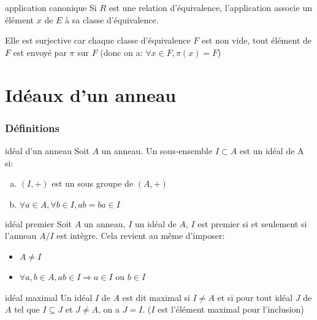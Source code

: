 \begin{proposition}{application canonique}{}
    Si $R$ est une relation d'équivalence, l'application 
    associe un élément $x$ de $E$ à sa classe d'équivalence.

    Elle est surjective car chaque classe d'équivalence $F$ est non vide, tout élément de $F$ est envoyé par
    $\pi$ sur $F$ (donc on a: $\forall x \in F, \pi(x) = F$)
\end{proposition}





\newpage


\section{Idéaux d'un anneau}

\subsubsection{Définitions}

\begin{definition}{idéal d'un anneau}{}
    Soit $A$ un anneau. Un sous-ensemble $I \subset A$ est un idéal de A si:
    \begin{enumerate}[(a)]
        \item $(I, +)$ est un sous groupe de $(A, +)$
        \item $\forall a \in A, \forall b \in I, ab = ba \in I$
    \end{enumerate}
\end{definition}

\begin{definition}{idéal premier}{}
    Soit $A$ un anneau, $I$ un idéal de $A$, $I$ est premier si et seulement si l'anneau $A/I$ est intègre.
    Cela revient au même d'imposer:
    \begin{itemize}
        \item $A \neq I$
        \item $\forall a, b \in A, ab \in I \Longrightarrow a \in I$ ou $ b \in I$
    \end{itemize}
\end{definition}

\begin{definition}{idéal maximal}{}
    Un idéal $I$ de $A$ est dit maximal si $I \neq A$ et si pour tout idéal $J$ de $A$ tel que $I \subseteq J$ et $J \neq A$, on a $J = I$.
    ($I$ est l'élément maximal pour l'inclusion)
\end{definition}



